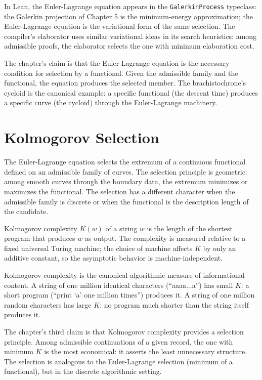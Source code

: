 In Lean, the Euler-Lagrange equation appears in the
\texttt{GalerkinProcess} typeclass: the Galerkin projection of
Chapter 5 is the minimum-energy approximation; the
Euler-Lagrange equation is the variational form of the same
selection. The compiler's elaborator uses similar variational
ideas in its search heuristics: among admissible proofs, the
elaborator selects the one with minimum elaboration cost.

The chapter's claim is that the Euler-Lagrange equation is the
necessary condition for selection by a functional. Given the
admissible family and the functional, the equation produces the
selected member. The brachistochrone's cycloid is the canonical
example: a specific functional (the descent time) produces a
specific curve (the cycloid) through the Euler-Lagrange machinery.

\section{Kolmogorov Selection}
\label{se:kolmogorov-selection}

The Euler-Lagrange equation selects the extremum of a continuous
functional defined on an admissible family of curves. The selection
principle is geometric: among smooth curves through the boundary
data, the extremum minimizes or maximizes the functional. The
selection has a different character when the admissible family is
discrete or when the functional is the description length of the
candidate.

Kolmogorov complexity $K(w)$ of a string $w$ is the length of the
shortest program that produces $w$ as output. The complexity is
measured relative to a fixed universal Turing machine; the choice of
machine affects $K$ by only an additive constant, so the asymptotic
behavior is machine-independent.

Kolmogorov complexity is the canonical algorithmic measure of
informational content. A string of one million identical characters
(``aaaa...a'') has small $K$: a short program (``print `a' one
million times'') produces it. A string of one million random
characters has large $K$: no program much shorter than the string
itself produces it.

The chapter's third claim is that Kolmogorov complexity provides a
selection principle. Among admissible continuations of a given
record, the one with minimum $K$ is the most economical: it
asserts the least unnecessary structure. The selection is
analogous to the Euler-Lagrange selection (minimum of a
functional), but in the discrete algorithmic setting.

